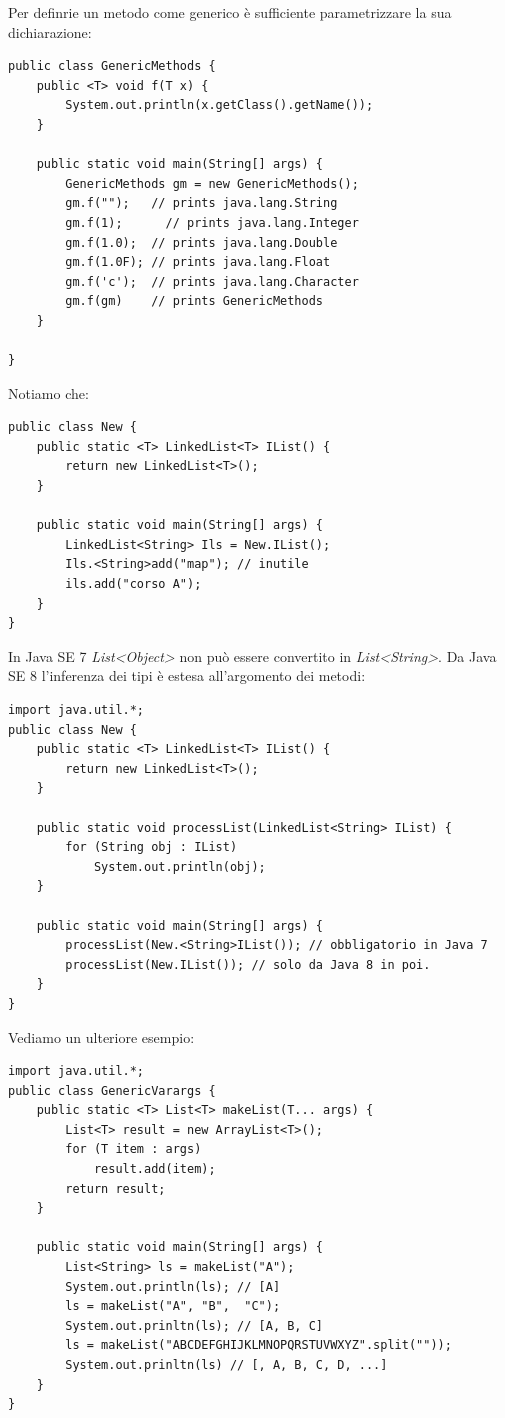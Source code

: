 \documentclass[12pt]{report}
\begin{document}
Per definrie un metodo come generico è sufficiente parametrizzare la sua dichiarazione:
\begin{lstlisting}[style=javastyle]
public class GenericMethods {
	public <T> void f(T x) {
		System.out.println(x.getClass().getName());
	}

	public static void main(String[] args) {
		GenericMethods gm = new GenericMethods();
		gm.f(""); 	// prints java.lang.String
		gm.f(1);	  // prints java.lang.Integer
		gm.f(1.0);	// prints java.lang.Double
		gm.f(1.0F); // prints java.lang.Float
		gm.f('c');  // prints java.lang.Character
		gm.f(gm)    // prints GenericMethods
	}

}
\end{lstlisting}
Notiamo che:
\begin{lstlisting}[style=javastyle]
public class New {
	public static <T> LinkedList<T> IList() {
		return new LinkedList<T>();
	}

	public static void main(String[] args) {
		LinkedList<String> Ils = New.IList();
		Ils.<String>add("map"); // inutile
		ils.add("corso A");
	}
}
\end{lstlisting}
In Java SE 7 \textit{List<Object>} non può essere convertito in \textit{List<String>}. Da Java SE 8 l'inferenza dei tipi è estesa all'argomento dei metodi:
\begin{lstlisting}[style=javastyle]
import java.util.*;
public class New {
	public static <T> LinkedList<T> IList() {
		return new LinkedList<T>();
	}

	public static void processList(LinkedList<String> IList) {
		for (String obj : IList)
			System.out.println(obj);
	}

	public static void main(String[] args) {
		processList(New.<String>IList()); // obbligatorio in Java 7
		processList(New.IList()); // solo da Java 8 in poi.
	}
}
\end{lstlisting}
Vediamo un ulteriore esempio:
\begin{lstlisting}[style=javastyle]
import java.util.*;
public class GenericVarargs {
	public static <T> List<T> makeList(T... args) {
		List<T> result = new ArrayList<T>();
		for (T item : args)
			result.add(item);
		return result;
	}

	public static void main(String[] args) {
		List<String> ls = makeList("A");
		System.out.println(ls); // [A]
		ls = makeList("A", "B",  "C");
		System.out.prinltn(ls); // [A, B, C]
		ls = makeList("ABCDEFGHIJKLMNOPQRSTUVWXYZ".split(""));
		System.out.prinltn(ls) // [, A, B, C, D, ...]
	}
}
\end{lstlisting}
\end{document}
